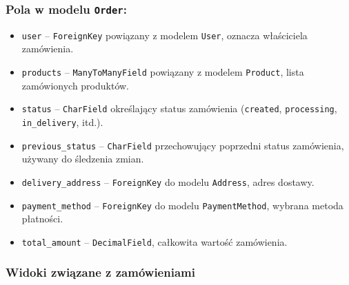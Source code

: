 \documentclass[12pt,a4paper,oneside]{article}
\theoremstyle{definition}
\numberwithin{equation}{section}
\begin{document}
\subsubsection{Pola w modelu \texttt{Order}:}
\begin{itemize}
    \item \texttt{user} – \texttt{ForeignKey} powiązany z modelem \texttt{User}, oznacza właściciela zamówienia.
    \item \texttt{products} – \texttt{ManyToManyField} powiązany z modelem \texttt{Product}, lista zamówionych produktów.
    \item \texttt{status} – \texttt{CharField} określający status zamówienia (\texttt{created}, \texttt{processing}, \texttt{in\_delivery}, itd.).
    \item \texttt{previous\_status} – \texttt{CharField} przechowujący poprzedni status zamówienia, używany do śledzenia zmian.
    \item \texttt{delivery\_address} – \texttt{ForeignKey} do modelu \texttt{Address}, adres dostawy.
    \item \texttt{payment\_method} – \texttt{ForeignKey} do modelu \texttt{PaymentMethod}, wybrana metoda płatności.
    \item \texttt{total\_amount} – \texttt{DecimalField}, całkowita wartość zamówienia.
\end{itemize}

\subsubsection{Widoki związane z zamówieniami}
\end{document}
